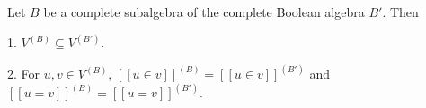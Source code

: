 Let $B$ be a complete subalgebra of the complete Boolean algebra $B'$. Then

1. $V^{(B)} \subseteq V^{(B')}$.

2. For $u, v \in V^{(B)}$, $[\![u \in v]\!]^{(B)} = [\![u \in v]\!]^{(B')}$ and $[\![u = v]\!]^{(B)} = [\![u = v]\!]^{(B')}$.
